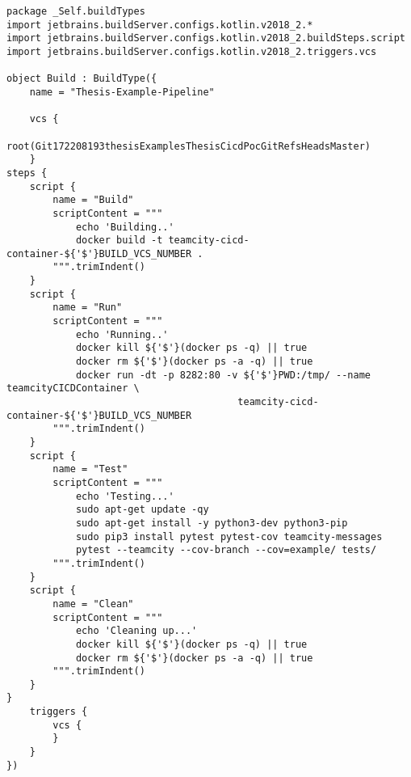 \begin{lstlisting}[frame=single, basicstyle=\tiny]
package _Self.buildTypes
import jetbrains.buildServer.configs.kotlin.v2018_2.*
import jetbrains.buildServer.configs.kotlin.v2018_2.buildSteps.script
import jetbrains.buildServer.configs.kotlin.v2018_2.triggers.vcs

object Build : BuildType({
    name = "Thesis-Example-Pipeline"

    vcs {
        root(Git172208193thesisExamplesThesisCicdPocGitRefsHeadsMaster)
    }
steps {
    script {
        name = "Build"
        scriptContent = """
            echo 'Building..'
            docker build -t teamcity-cicd-container-${'$'}BUILD_VCS_NUMBER .
        """.trimIndent()
    }
    script {
        name = "Run"
        scriptContent = """
            echo 'Running..'
            docker kill ${'$'}(docker ps -q) || true
            docker rm ${'$'}(docker ps -a -q) || true
            docker run -dt -p 8282:80 -v ${'$'}PWD:/tmp/ --name teamcityCICDContainer \
                                        teamcity-cicd-container-${'$'}BUILD_VCS_NUMBER
        """.trimIndent()
    }
    script {
        name = "Test"
        scriptContent = """
            echo 'Testing...'
            sudo apt-get update -qy
            sudo apt-get install -y python3-dev python3-pip
            sudo pip3 install pytest pytest-cov teamcity-messages
            pytest --teamcity --cov-branch --cov=example/ tests/
        """.trimIndent()
    }
    script {
        name = "Clean"
        scriptContent = """
            echo 'Cleaning up...'
            docker kill ${'$'}(docker ps -q) || true
            docker rm ${'$'}(docker ps -a -q) || true
        """.trimIndent()
    }
}
    triggers {
        vcs {
        }
    }
})
\end{lstlisting}
